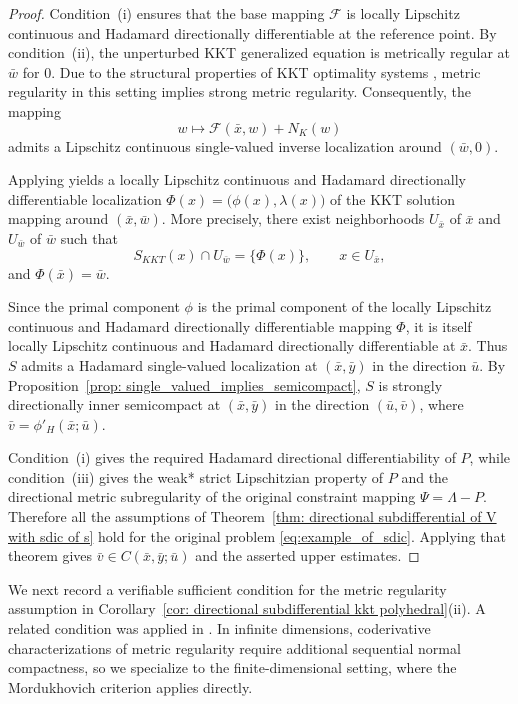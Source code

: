 \documentclass[12pt,twoside,reqno]{amsart}
\theoremstyle{definition}
\numberwithin{equation}{section}
\begin{document}
\begin{proof}
    Condition~(i) ensures that the base mapping $\mathcal{F}$ is locally Lipschitz continuous and Hadamard directionally differentiable at the reference point. By condition~(ii), the unperturbed KKT generalized equation is metrically regular at $\bar{w}$ for $0$. Due to the structural properties of KKT optimality systems \cite[Sections~4H and~4I.2]{dontchev2009implicit}, metric regularity in this setting implies strong metric regularity. Consequently, the
    mapping 
    \[
        w\mapsto\mathcal{F}(\bar{x},w)+N_K(w)
    \]
    admits a Lipschitz continuous single-valued inverse localization around $(\bar{w},0)$.

    Applying \cite[Theorem~2.4, Remark~2.6]{dontchev1995implicit} yields a locally Lipschitz continuous and Hadamard directionally differentiable
    localization $\Phi(x)=\bigl(\phi(x),\lambda(x)\bigr)$ 
    of the KKT solution mapping around $(\bar{x},\bar{w})$. More precisely, there exist neighborhoods $U_{\bar{x}}$ of $\bar{x}$ and $U_{\bar{w}}$ of $\bar{w}$ such that
    \[
        S_{KKT}(x)\cap U_{\bar{w}}=\{\Phi(x)\},
        \qquad x\in U_{\bar{x}},
    \]
    and $\Phi(\bar{x})=\bar{w}$.

Since the primal component $\phi$ is the primal component of the locally Lipschitz continuous and Hadamard directionally differentiable mapping $\Phi$, it is itself locally Lipschitz continuous and Hadamard directionally differentiable at $\bar{x}$. Thus $S$ admits a Hadamard single-valued localization at $(\bar{x},\bar{y})$ in the direction $\bar{u}$. By Proposition~\ref{prop: single_valued_implies_semicompact}, $S$ is strongly directionally inner semicompact at $(\bar{x},\bar{y})$ in the direction $(\bar{u},\bar{v})$, where $\bar{v}=\phi'_H(\bar{x};\bar{u})$. 

    Condition~(i) gives the required Hadamard directional differentiability
    of $P$, while condition~(iii) gives the weak* strict Lipschitzian
    property of $P$ and the directional metric subregularity of the
    original constraint mapping $\Psi=\Lambda-P$. Therefore all the
    assumptions of
    Theorem~\ref{thm: directional subdifferential of V with sdic of s}
    hold for the original problem \eqref{eq:example_of_sdic}. Applying that
    theorem gives $\bar{v}\in C(\bar{x},\bar{y};\bar{u})$ and the asserted
    upper estimates.
\end{proof}



We next record a verifiable sufficient condition for the metric regularity assumption in Corollary~\ref{cor: directional subdifferential kkt polyhedral}(ii). A related condition was applied in \cite[Theorem~5.1]{ye2000constraint}.  
In infinite dimensions, coderivative characterizations of metric regularity require additional sequential normal compactness, so we specialize to the finite-dimensional setting, where the Mordukhovich criterion applies directly.   
\end{document}
